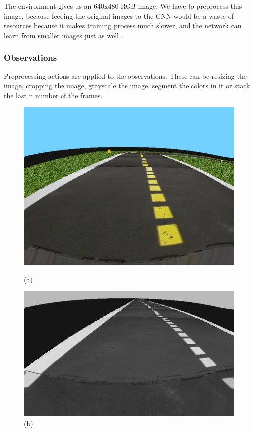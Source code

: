 \documentclass{article}
\begin{document}
The environment gives us an 640x480 RGB image.
We have to preprocess this image, because feeding the original images to the CNN would be a waste of resources because it makes training process much slower, and the network can learn from smaller images just as well \cite{kalap}.

\subsubsection{\normalsize{Observations}}

Preprocessing actions are applied to the observations. These can be resizing the image, cropping the image, grayscale the image, segment the colors in it or stack the last n number of the frames.

\begin{figure}[H]
	\centering
	\begin{minipage}{.3\textwidth}
	\centering
	\includegraphics[width=0.8\linewidth]{rawobs.jpg}
	\caption{(a)}
	\end{minipage}%
	\begin{minipage}{.3\textwidth}
	\centering
	\includegraphics[width=0.8\linewidth]{grayscale.jpg}
	\caption{(b)}

\end{minipage}
\end{figure}
\end{document}
